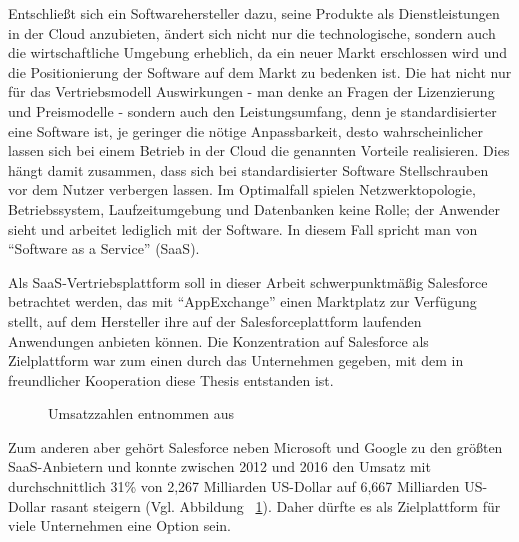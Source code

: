 Entschließt sich ein Softwarehersteller dazu, seine Produkte 
als Dienstleistungen in der Cloud anzubieten, ändert sich nicht nur die 
technologische, sondern auch die wirtschaftliche Umgebung erheblich, da ein 
neuer Markt erschlossen wird und die Positionierung der Software auf dem Markt 
zu bedenken ist. Die hat nicht nur für das Vertriebsmodell  Auswirkungen - man 
denke an Fragen der Lizenzierung und Preismodelle - sondern auch den 
Leistungsumfang, denn je standardisierter eine Software ist, je 
geringer die nötige Anpassbarkeit, desto wahrscheinlicher lassen sich bei einem 
Betrieb in der 
Cloud die genannten Vorteile realisieren.  Dies 
hängt damit zusammen, dass sich bei standardisierter Software Stellschrauben 
vor dem Nutzer verbergen lassen. Im Optimalfall spielen Netzwerktopologie, 
Betriebssystem, Laufzeitumgebung und Datenbanken keine Rolle; der Anwender 
sieht und arbeitet lediglich mit der Software. In diesem Fall spricht man von 
"`Software as a Service"' (SaaS). 

Als SaaS-Vertriebsplattform soll in dieser Arbeit schwerpunktmäßig Salesforce 
betrachtet werden, das mit "`AppExchange"' einen Marktplatz zur Verfügung 
stellt, auf dem Hersteller ihre auf der Salesforceplattform laufenden 
Anwendungen anbieten können. Die Konzentration auf Salesforce als Zielplattform 
war zum einen durch das Unternehmen gegeben, mit dem in freundlicher 
Kooperation diese Thesis entstanden ist.

\begin{figure}[bh]
\begin{center}
\caption{Umsatzzahlen entnommen aus \cite[43]{salesforceannualreport} }
\label{UmsatzzahlenSalesforce}
\end{center}
\end{figure}
Zum anderen aber gehört Salesforce neben Microsoft 
und Google zu den größten SaaS-Anbietern
 und konnte zwischen 2012 und 2016 
den Umsatz mit durchschnittlich 31\% von 2,267 Milliarden US-Dollar auf 
6,667 Milliarden US-Dollar rasant steigern (Vgl. Abbildung 
~\ref{UmsatzzahlenSalesforce}). Daher dürfte es als Zielplattform für 
viele Unternehmen eine Option sein.

